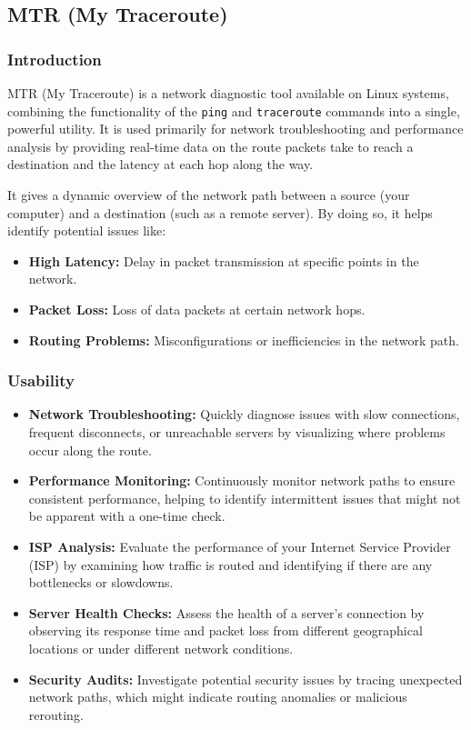 \documentclass{article}
\begin{document}
\subsection{MTR (My Traceroute)}

\subsubsection{Introduction}
MTR (My Traceroute) is a network diagnostic tool available on Linux systems, combining the functionality of the \verb|ping| and \verb|traceroute| commands into a single, powerful utility. It is used primarily for network troubleshooting and performance analysis by providing real-time data on the route packets take to reach a destination and the latency at each hop along the way.

It gives a dynamic overview of the network path between a source (your computer) and a destination (such as a remote server). By doing so, it helps identify potential issues like:

\begin{itemize}
    \item \textbf{High Latency:} Delay in packet transmission at specific points in the network.
    \item \textbf{Packet Loss:} Loss of data packets at certain network hops.
    \item \textbf{Routing Problems:} Misconfigurations or inefficiencies in the network path.
\end{itemize}  
 
\subsubsection{Usability}

\begin{itemize}
    \item \textbf{Network Troubleshooting:} Quickly diagnose issues with slow connections, frequent disconnects, or unreachable servers by visualizing where problems occur along the route.
    
    \item \textbf{Performance Monitoring:} Continuously monitor network paths to ensure consistent performance, helping to identify intermittent issues that might not be apparent with a one-time check.
    
    \item \textbf{ISP Analysis:} Evaluate the performance of your Internet Service Provider (ISP) by examining how traffic is routed and identifying if there are any bottlenecks or slowdowns.
    
    \item \textbf{Server Health Checks:} Assess the health of a server's connection by observing its response time and packet loss from different geographical locations or under different network conditions.
    
    \item \textbf{Security Audits:} Investigate potential security issues by tracing unexpected network paths, which might indicate routing anomalies or malicious rerouting.
\end{itemize}
\end{document}
